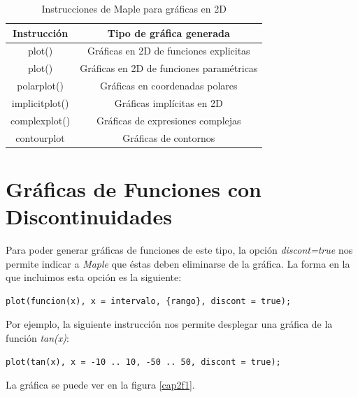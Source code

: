 \documentclass[letterpaper,12pt]{book}
\begin{document}
\begin{table}[h!]
	\caption{Instrucciones de Maple para gráficas en 2D}
	\begin{center}
		\begin{tabular}{|c|c|} \hline
			Instrucción & Tipo de gráfica generada \\ \hline
			plot() & Gráficas en 2D de funciones explicitas \\ \hline
			plot() & Gráficas en 2D de funciones paramétricas \\ \hline
			polarplot() & Gráficas en coordenadas polares \\ \hline
			implicitplot() & Gráficas implícitas en 2D \\ \hline
			complexplot() & Gráficas de expresiones complejas \\ \hline
			contourplot & Gráficas de contornos \\\hline
		\end{tabular}
	\end{center}
	\label{tab:cap1t1}
\end{table}

\chapter{Gráficas de Funciones con Discontinuidades}

Para poder generar gráficas de funciones de este tipo, la opción
\emph{discont=true} nos permite indicar a \emph{Maple} que éstas deben eliminarse de la
gráfica. La forma en la que incluimos esta opción es la siguiente:

\begin{verbatim}
plot(funcion(x), x = intervalo, {rango}, discont = true);
\end{verbatim}

Por ejemplo, la siguiente instrucción nos permite desplegar una gráfica de la 
función \emph{tan(x)}:

\begin{verbatim}
plot(tan(x), x = -10 .. 10, -50 .. 50, discont = true);
\end{verbatim}

La gráfica se puede ver en la figura \ref{cap2f1}.
\end{document}
